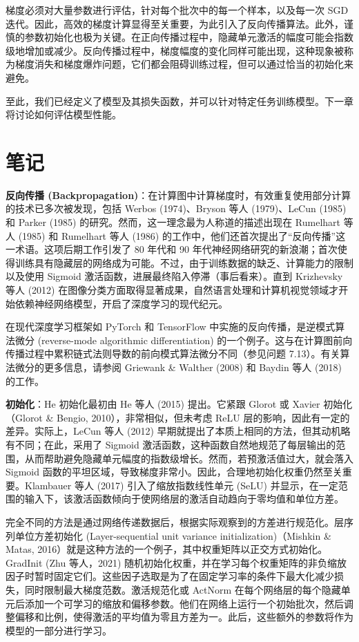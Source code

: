 \documentclass[lang=cn,newtx,10pt,scheme=chinese]{elegantbook}
\begin{document}
梯度必须对大量参数进行评估，针对每个批次中的每一个样本，以及每一次 SGD 迭代。因此，高效的梯度计算显得至关重要，为此引入了反向传播算法。此外，谨慎的参数初始化也极为关键。在正向传播过程中，隐藏单元激活的幅度可能会指数级地增加或减少。反向传播过程中，梯度幅度的变化同样可能出现，这种现象被称为梯度消失和梯度爆炸问题，它们都会阻碍训练过程，但可以通过恰当的初始化来避免。

至此，我们已经定义了模型及其损失函数，并可以针对特定任务训练模型。下一章将讨论如何评估模型性能。
\section{笔记}
\textbf{反向传播 (Backpropagation)}：在计算图中计算梯度时，有效重复使用部分计算的技术已多次被发现，包括 Werbos (1974)、Bryson 等人 (1979)、LeCun (1985) 和 Parker (1985) 的研究。然而，这一理念最为人称道的描述出现在 Rumelhart 等人 (1985) 和 Rumelhart 等人 (1986) 的工作中，他们还首次提出了“反向传播”这一术语。这项后期工作引发了 80 年代和 90 年代神经网络研究的新浪潮；首次使得训练具有隐藏层的网络成为可能。不过，由于训练数据的缺乏、计算能力的限制以及使用 Sigmoid 激活函数，进展最终陷入停滞（事后看来）。直到 Krizhevsky 等人 (2012) 在图像分类方面取得显著成果，自然语言处理和计算机视觉领域才开始依赖神经网络模型，开启了深度学习的现代纪元。

在现代深度学习框架如 PyTorch 和 TensorFlow 中实施的反向传播，是逆模式算法微分 (reverse-mode algorithmic differentiation) 的一个例子。这与在计算图前向传播过程中累积链式法则导数的前向模式算法微分不同（参见问题 7.13）。有关算法微分的更多信息，请参阅 Griewank \& Walther (2008) 和 Baydin 等人 (2018) 的工作。

\textbf{初始化}：He 初始化最初由 He 等人 (2015) 提出。它紧跟 Glorot 或 Xavier 初始化（Glorot \& Bengio, 2010），非常相似，但未考虑 ReLU 层的影响，因此有一定的差异。实际上，LeCun 等人 (2012) 早期就提出了本质上相同的方法，但其动机略有不同；在此，采用了 Sigmoid 激活函数，这种函数自然地规范了每层输出的范围，从而帮助避免隐藏单元幅度的指数级增长。然而，若预激活值过大，就会落入 Sigmoid 函数的平坦区域，导致梯度非常小。因此，合理地初始化权重仍然至关重要。Klambauer 等人 (2017) 引入了缩放指数线性单元 (SeLU) 并显示，在一定范围的输入下，该激活函数倾向于使网络层的激活自动趋向于零均值和单位方差。

完全不同的方法是通过网络传递数据后，根据实际观察到的方差进行规范化。层序列单位方差初始化 (Layer-sequential unit variance initialization)（Mishkin \& Matas, 2016）就是这种方法的一个例子，其中权重矩阵以正交方式初始化。GradInit (Zhu 等人，2021) 随机初始化权重，并在学习每个权重矩阵的非负缩放因子时暂时固定它们。这些因子选取是为了在固定学习率的条件下最大化减少损失，同时限制最大梯度范数。激活规范化或 ActNorm 在每个网络层的每个隐藏单元后添加一个可学习的缩放和偏移参数。他们在网络上运行一个初始批次，然后调整偏移和比例，使得激活的平均值为零且方差为一。此后，这些额外的参数将作为模型的一部分进行学习。
\end{document}
